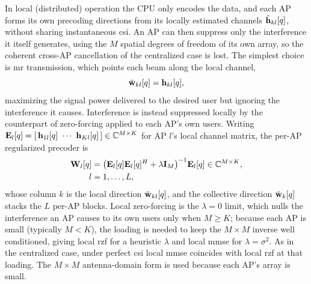 In local (distributed) operation the CPU only encodes the data, and each AP forms
its own precoding directions from its locally estimated channels
$\hat{\boldsymbol{\mathrm{h}}}_{kl}[q]$, without sharing instantaneous \gls{csi}. An AP can then
suppress only the interference it itself generates, using the $M$ spatial degrees
of freedom of its own array, so the coherent cross-AP cancellation of the
centralized case is lost. The simplest choice is \gls{mr} transmission, which
points each beam along the local channel,
\begin{equation}
\label{eq:mr-precoder}
\bar{\boldsymbol{\mathrm{w}}}_{kl}[q] = \boldsymbol{\mathrm{h}}_{kl}[q],
\end{equation}
maximizing the signal power delivered to the desired user but ignoring the
interference it causes. Interference is instead suppressed locally by the
counterpart of zero-forcing applied to each AP's own users. Writing
$\mat{E}_{l}[q]=[\,\vect{h}_{1l}[q]\ \cdots\ \vect{h}_{Kl}[q]\,]\inC{M\times K}$
for AP $l$'s local channel matrix, the per-AP regularized precoder is
\begin{align}
\label{eq:local-rzf}
\boldsymbol{\mathrm{W}}_{l}[q] &= \big(\boldsymbol{\mathrm{E}}_{l}[q]\boldsymbol{\mathrm{E}}_{l}[q]^{H}+\lambda\boldsymbol{\mathrm{I}}_{M}\big)^{-1}
\boldsymbol{\mathrm{E}}_{l}[q] \in\mathbb{C}^{M\times K},\\
 l&=1,\dots,L,
\end{align}
whose column $k$ is the local direction $\bar{\boldsymbol{\mathrm{w}}}_{kl}[q]$, and the
collective direction $\bar{\boldsymbol{\mathrm{w}}}_{k}[q]$ stacks the $L$ per-AP blocks. Local
zero-forcing is the $\lambda=0$ limit, which nulls the interference an AP causes
to its own users only when $M\geq K$; because each AP is small (typically
$M<K$), the loading is needed to keep the $M\times M$ inverse well conditioned,
giving local \gls{rzf} for a heuristic $\lambda$ and local \gls{mmse} for
$\lambda=\sigma^{2}$. As in the centralized case, under perfect \gls{csi} local
\gls{mmse} coincides with local \gls{rzf} at that loading. The $M\times M$
antenna-domain form is used because each AP's array is small.

